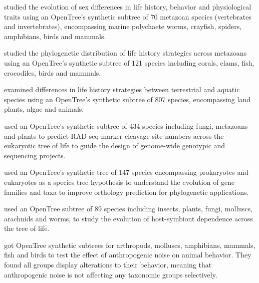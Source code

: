 \documentclass[oupdraft]{sysbio_sse}
\begin{document}
\citep{tarka2018sex} studied the evolution of sex differences in life history, behavior
and physiological traits using an OpenTree's synthetic subtree of 70 metazoan species (vertebrates and invertebrates),
encompassing marine polychaete worms, crayfish, spiders, amphibians, birds and mammals.

\citep{healy2019animal} studied the phylogenetic distribution of life history strategies across metazoans
using an OpenTree's synthetic subtree of 121 species including corals, clams,
fish, crocodiles, birds and mammals.

\citep{capdevila2020longevity} examined differences in life history strategies between
terrestrial and aquatic species using an OpenTree's synthetic subtree of 807 species,
encompassing land plants, algae and animals.

\citep{herrera2015predicting} used an OpenTree's synthetic subtree of 434 species
including fungi, metazoans and plants to predict RAD-seq marker cleavage site numbers
across the eukaryotic tree of life to guide the design of genome-wide genotypic and
sequencing projects.

\citep{boeckmann2015quest} used an OpenTree's synthetic tree of 147 species encompassing
prokaryotes and eukaryotes as a species tree hypothesis to understand the evolution
of gene families and taxa to improve orthology prediction for phylogenetic applications.


\citep{fisher2017evolution} used an OpenTree subtree of 89 species including insects, plants,
fungi, molluscs, arachnids and worms, to study the evolution of host-symbiont
dependence across the tree of life.

\citep{kunc2019effects} got OpenTree synthetic subtrees for arthropods, molluscs,
amphibians, mammals, fish and birds to test the effect of anthropogenic noise on
animal behavior. They found all groups display alterations to their behavior, meaning
that anthropogenic noise is not affecting any taxonomic groups selectively.
\end{document}
